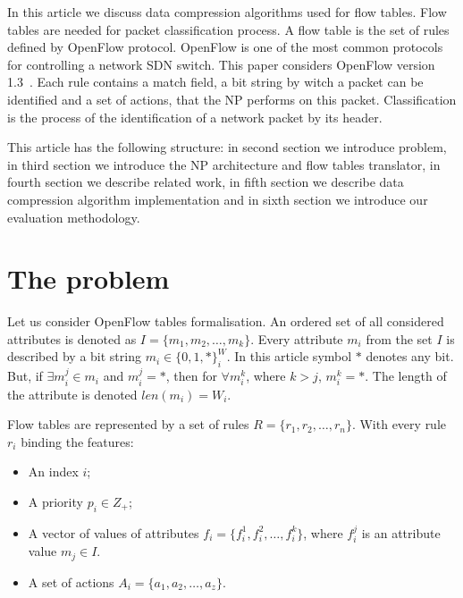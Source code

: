 \documentclass[conference]{IEEEtran}
\begin{document}
        In this article we discuss data compression algorithms used for flow tables. Flow tables are needed for packet classification process. 
        A flow table is the set of rules defined by OpenFlow protocol. OpenFlow is one of the most common protocols 
        for controlling a network SDN switch. This paper considers OpenFlow version 1.3~\cite{openflow}. Each rule contains a match field, 
        a bit string by witch a packet can be identified and a set of actions, that the NP performs on this packet. 
        Classification is the process of the identification of a network packet by its header.

        This article has the following structure: in second section we introduce problem, in third section we introduce 
        the NP architecture and flow tables translator, in fourth section we describe related work, in fifth section we
        describe data compression algorithm implementation and in sixth section we introduce our evaluation methodology.

    \section{The problem}
    \label{sect:problem}
        Let us consider OpenFlow tables formalisation. An ordered set of all considered attributes is denoted as \(I=\{m_1,m_2,\ldots,m_k\}\). 
        Every attribute \(m_i\) from the set \(I\) is described by a bit string \(m_i \in \{0, 1, *\}^W_i\).
        In this article symbol \(*\) denotes any bit. But, if \(\exists m_i^j \in m_i\) and  \( m_i^j = *\), 
        then for \( \forall m_i^k \), where \(k > j\), \( m_i^k = *\). The length of the attribute is denoted \(len(m_i) = W_i\).

        Flow tables are represented by a set of rules \(R=\{r_1,r_2,\ldots,r_n\}\). With every rule \(r_i\) binding the features:
        \begin{itemize}
            \item An index \(i\);
            \item A priority \(p_i \in Z_+\);
            \item A vector of values of attributes \(f_i=\{f_i^1,f_i^2,\ldots,f_i^k\}\), where \(f_i^j\) is an attribute value \(m_j\in I\). %
            \item A set of actions \(A_i = \{a_1, a_2, \ldots, a_z\} \).
        \end{itemize}
\end{document}
